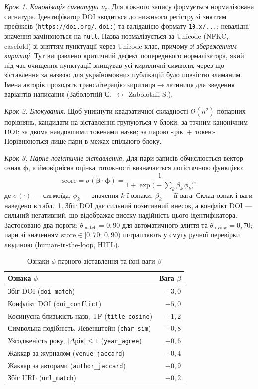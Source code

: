 \emph{Крок 1. Канонізація сигнатури $\nu_\tau$.} Для кожного запису формується нормалізована сигнатура. Ідентифікатор DOI зводиться до нижнього регістру зі зняттям префіксів (\texttt{https://doi.org/}, \texttt{doi:}) та валідацією формату \texttt{10.x/...}; невалідні значення замінюються на \texttt{null}. Назва нормалізується за Unicode (NFKC, casefold) зі зняттям пунктуації через Unicode-клас, причому \emph{зі збереженням кирилиці}. Тут виправлено критичний дефект попереднього нормалізатора, який під час очищення пунктуації знищував усі кириличні символи, через що зіставлення за назвою для україномовних публікацій було повністю зламаним. Імена авторів проходять транслітерацію кирилиця$\rightarrow$латиниця для зведення варіантів написання (Заболотній С.~$\leftrightarrow$~Zabolotnii S.).

\emph{Крок 2. Блокування.} Щоб уникнути квадратичної складності $O(n^2)$ попарних порівнянь, кандидати на зіставлення групуються у блоки: за точним канонічним DOI; за двома найдовшими токенами назви; за парою «рік~$+$~токен». Порівнюються лише пари в межах спільного блоку.

\emph{Крок 3. Парне логістичне зіставлення.} Для пари записів обчислюється вектор ознак $\boldsymbol{\phi}$, а ймовірнісна оцінка тотожності визначається логістичною функцією:
\begin{equation}
\mathrm{score} = \sigma(\boldsymbol{\beta}\cdot\boldsymbol{\phi}) = \frac{1}{1+\exp\!\big(-\sum_{k}\beta_k\,\phi_k\big)},
\end{equation}
де $\sigma(\cdot)$ — сигмоїда, $\phi_k$ — значення $k$-ї ознаки, $\beta_k$ — її вага. Склад ознак і ваги наведено в табл.~1. Збіг DOI дає сильний позитивний внесок, а конфлікт DOI — сильний негативний, що відображає високу надійність цього ідентифікатора. Застосовано два пороги: $\theta_{\text{match}}=0{,}90$ для автоматичного злиття та $\theta_{\text{review}}=0{,}70$; пари зі значенням $\mathrm{score}\in[0{,}70;\,0{,}90)$ потрапляють у смугу ручної перевірки людиною (human-in-the-loop, HITL).

\begin{table}[ht]
\centering
\caption{Ознаки $\phi$ парного зіставлення та їхні ваги $\beta$}
\label{tab:features}
\begin{tabular}{lr}
\toprule
Ознака $\phi$ & Вага $\beta$ \\
\midrule
Збіг DOI (\texttt{doi\_match}) & $+3{,}0$ \\
Конфлікт DOI (\texttt{doi\_conflict}) & $-5{,}0$ \\
Косинусна близькість назв, TF (\texttt{title\_cosine}) & $+1{,}2$ \\
Символьна подібність, Левенштейн (\texttt{char\_sim}) & $+0{,}8$ \\
Узгодженість року, $|\Delta\text{рік}|\le 1$ (\texttt{year\_agree}) & $+0{,}6$ \\
Жаккар за журналом (\texttt{venue\_jaccard}) & $+0{,}4$ \\
Жаккар за авторами (\texttt{author\_jaccard}) & $+0{,}9$ \\
Збіг URL (\texttt{url\_match}) & $+0{,}2$ \\
\bottomrule
\end{tabular}
\end{table}

